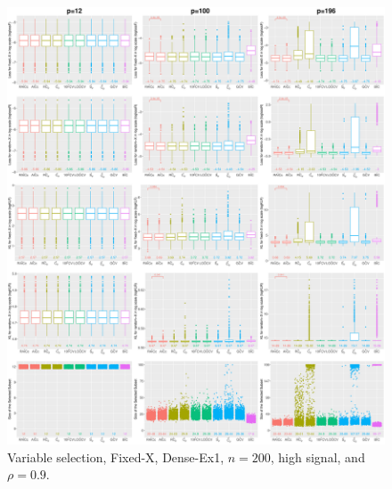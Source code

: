 \begin{figure}[!ht]
\centering
\includegraphics[width=\textwidth]{figures/supplement/fixedx/subset_selection/Dense-Ex1_n200_hsnr_rho09.eps}
\caption{Variable selection, Fixed-X, Dense-Ex1, $n=200$, high signal, and $\rho=0.9$.}
\end{figure}
\clearpage
